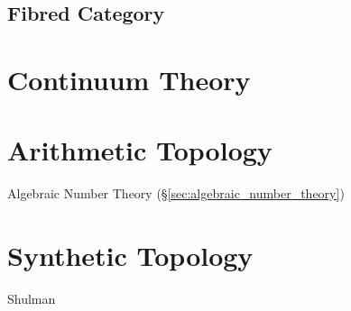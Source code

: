 \subsection{Fibred Category}\label{sec:fibred_category}



\section{Continuum Theory}\label{sec:continuum_theory}

\section{Arithmetic Topology}\label{sec:arithmetic_topology}

Algebraic Number Theory (\S\ref{sec:algebraic_number_theory})



\section{Synthetic Topology}\label{sec:synthetic_topology}

\fist Shulman
